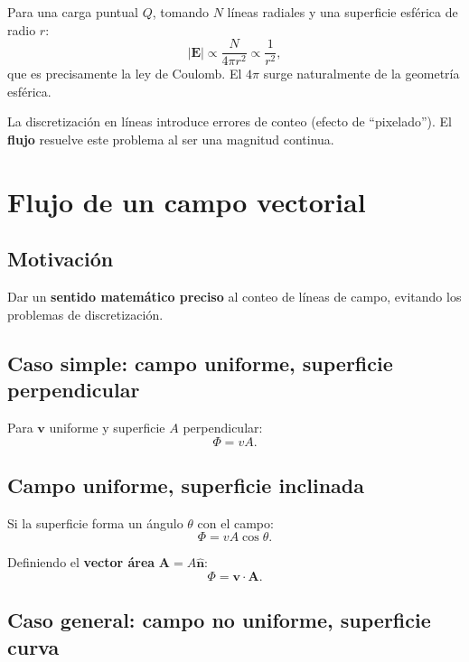 \documentclass[12pt,a4paper]{article}
\begin{document}
Para una carga puntual $Q$, tomando $N$ líneas radiales y una
superficie esférica de radio $r$:
\[
|\mathbf{E}| \propto \frac{N}{4\pi r^{2}} \propto \frac{1}{r^{2}},
\]
que es precisamente la ley de Coulomb. El $4\pi$ surge naturalmente
de la geometría esférica.

\begin{warnbox}[Limitación]
  La discretización en líneas introduce errores de conteo (efecto de
  ``pixelado''). El \textbf{flujo} resuelve este problema al ser una
  magnitud continua.
\end{warnbox}

\section{Flujo de un campo vectorial}

\subsection{Motivación}

Dar un \textbf{sentido matemático preciso} al conteo de líneas de
campo, evitando los problemas de discretización.

\subsection{Caso simple: campo uniforme, superficie perpendicular}

Para $\mathbf{v}$ uniforme y superficie $A$ perpendicular:
\[
\Phi = v A .
\]

\subsection{Campo uniforme, superficie inclinada}

Si la superficie forma un ángulo $\theta$ con el campo:
\[
\Phi = v A \cos\theta .
\]



Definiendo el \textbf{vector área} $\mathbf{A} = A \hat{\mathbf{n}}$:
\[
\boxed{\Phi = \mathbf{v} \cdot \mathbf{A}} .
\]

\subsection{Caso general: campo no uniforme, superficie curva}
\end{document}
